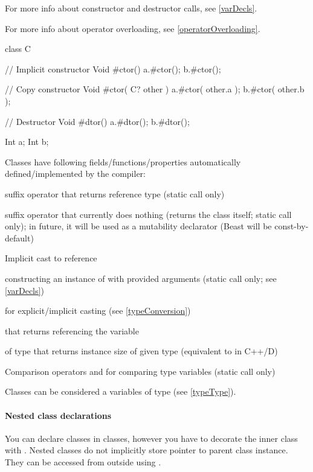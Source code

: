 For more info about constructor and destructor calls, see \autoref{varDecls}.

For more info about operator overloading, see \autoref{operatorOverloading}.

\begin{code}
class C {

	// Implicit constructor
	Void #ctor() {
		a.#ctor();
		b.#ctor();
	}
	
	// Copy constructor
	Void #ctor( C? other ) {
		a.#ctor( other.a );
		b.#ctor( other.b );	
	}

	// Destructor
	Void #dtor() {
		a.#dtor();
		b.#dtor();	
	}

	Int a;
	Int b;

}
\end{code}

Classes have following fields/functions/properties automatically defined/implemented by the compiler:
\begin{compactenum}
	\item {} suffix operator that returns reference type (static call only)
	\item {} suffix operator that currently does nothing (returns the class itself; static call only); in future, it will be used as a mutability declarator (Beast will be const-by-default)
	\item Implicit cast to reference
	\item {} constructing an instance of  with provided arguments (static call only; see \autoref{varDecls})
	\item {} for explicit/implicit casting (see \autoref{typeConversion})
	\item {} that returns  referencing the variable 
	\item {} of type  that returns instance size of given type (equivalent to  in C++/D)
	\item Comparison operators  and  for comparing type variables (static call only)
\end{compactenum}

Classes can be considered a \ctime variables of type  (see \autoref{typeType}).

\paragraph{Nested class declarations}
You can declare classes in classes, however you have to decorate the inner class with . Nested classes do not implicitly store pointer to parent class instance. They can be accessed from outside using .

